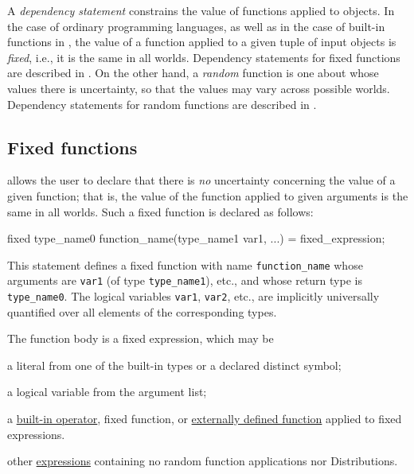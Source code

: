 A {\em dependency statement} constrains the value of functions applied to objects. In the case of ordinary programming languages,
as well as in the case of built-in functions in \bl, the value of a function applied to a given tuple of input objects is {\em fixed},
i.e., it is the same in all worlds. Dependency statements for fixed functions are described in . On the other hand, a {\em random} function
is one about whose values there is uncertainty, so that the values may vary across possible worlds. Dependency statements for random functions are described in .



\subsection{Fixed functions}\label{fixed-section}

\bl allows the user to declare that there is {\em no} uncertainty concerning the value of a given function; that is, the
value of the function applied to given arguments is the same in all worlds. Such a fixed function is declared as follows:
\begin{blogcode}
fixed type_name0 function_name(type_name1 var1, ...) = 
  fixed_expression;
\end{blogcode}
This statement defines a fixed function with name \texttt{function\_name} whose arguments are {\tt var1} (of type \verb|type_name1|), etc.,
and whose return type is \verb|type_name0|. The logical variables {\tt var1}, {\tt var2}, etc., are implicitly universally quantified over
all elements of the corresponding types.

The function body is a fixed expression, which may be
\begin{itemize*}
\item a literal from one of the built-in types or a declared distinct symbol;
\item a logical variable from the argument list;
\item a \hyperref[builtin-operator-appendix]{built-in operator}, fixed function, or \hyperref[user-defined-function-section]{externally defined function} applied to fixed expressions.
\item other \hyperref[expression-section]{expressions} containing no random function applications nor Distributions.
\end{itemize*}

